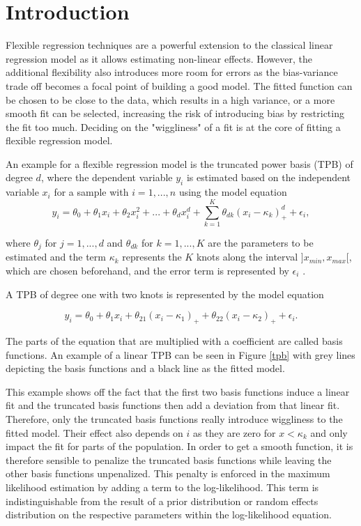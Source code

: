 \documentclass[12pt]{article}
\begin{document}
\begin{titlepage}
\clearpage
\end{titlepage}

\setcounter{page}{2}
\tableofcontents
\clearpage

\section{Introduction}\label{intro}

Flexible regression techniques are a powerful extension to the classical linear regression model as it allows estimating non-linear effects. However, the additional flexibility also introduces more room for errors as the bias-variance trade off becomes a focal point of building a good model. The fitted function can be chosen to be close to the data, which results in a high variance, or a more smooth fit can be selected,  increasing the risk of introducing bias by restricting the fit too much. Deciding on the "wiggliness" of a fit is at the core of fitting a flexible regression model.

An example for a flexible regression model is the truncated power basis (TPB) of degree $d$, where the dependent variable $y_i$ is estimated based on the independent variable $x_i$ for a sample with $i=1,...,n$ using the model equation
$$y_i = 
 \theta_0 + \theta_1x_i + \theta_2x_i^2 + ... + \theta_dx_i^d + \sum_{k=1}^K \theta_{dk}(x_i-\kappa_k)_+^d +\epsilon_i,$$
 
 where $\theta_j$ for $j= 1,...,d$ and $\theta_{dk}$ for $k= 1,...,K$ are the parameters to be estimated and the term $\kappa_k$ represents the $K$ knots along the interval $]x_{min},x_{max}[$, which are chosen beforehand, and the error term is represented by $\epsilon_i$ \cite{ruppert2003semiparametric, wand2003smoothing}.
 
  A TPB of degree one with two knots is represented by the model equation
 
 $$y_i = 
 \theta_0 + \theta_1x_i +  \theta_{21}(x_i-\kappa_1)_+ + \theta_{22}(x_i-\kappa_2)_+ + \epsilon_i.$$
 
 The parts of the equation that are multiplied with a coefficient are called basis functions. 
An example of a linear TPB can be seen in Figure \ref{tpb} with grey lines depicting the basis functions and a black line as the fitted model.
 
This example shows off the fact that the first two basis functions induce a linear fit and the truncated basis functions then add a deviation from that linear fit. Therefore, only the truncated basis functions really introduce wiggliness to the fitted model. 
Their effect also depends on $i$ as they are zero for $x<\kappa_k$ and only impact the fit for parts of the population. 
In order to get a smooth function, it is therefore sensible to penalize the truncated basis functions while leaving the other basis functions unpenalized. This penalty is enforced in the maximum likelihood estimation by adding a term to the log-likelihood. This term is indistinguishable  from the result of a prior distribution or random effects distribution on the respective parameters within the log-likelihood equation. 
\end{document}
